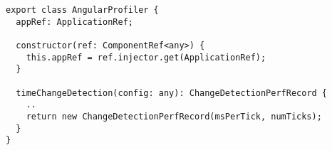 \begin{verbatim}
export class AngularProfiler {
  appRef: ApplicationRef;

  constructor(ref: ComponentRef<any>) {
    this.appRef = ref.injector.get(ApplicationRef);
  }

  timeChangeDetection(config: any): ChangeDetectionPerfRecord {
    ..
    return new ChangeDetectionPerfRecord(msPerTick, numTicks);
  }
}
\end{verbatim}
